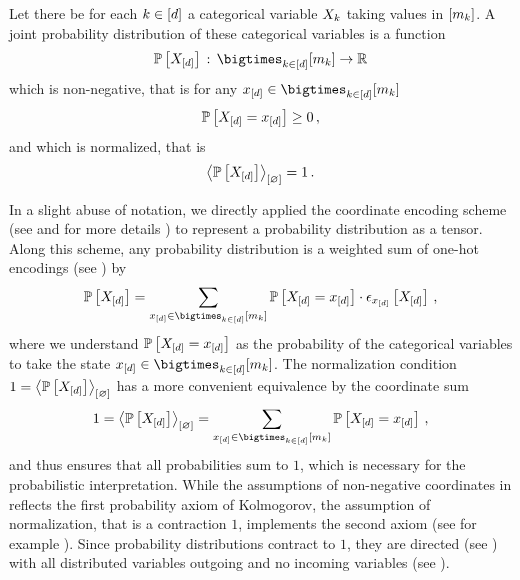 \begin{definition}
    \label{def:probabilityDistribution} %
    Let there be for each $k\in[d]$ a categorical variable $X_{k}$ taking values in $[m_{k}]$.
    A joint probability distribution of these categorical variables is a function
    \begin{align*}
        \probwith \defcols \facstates \rightarrow \rr
    \end{align*}
    which is non-negative, that is for any $\shortcatindicesin$
    \begin{align*}
        \mathbb{P}\left[X_{[d]}=x_{[d]}\right] \geq 0 \, ,
    \end{align*}
    and which is normalized, that is
    \begin{align*}
        \left\langle \mathbb{P}\left[X_{[d]}\right]\right\rangle_{\left[ \varnothing \right]} = 1 \, .
    \end{align*}
\end{definition}

In a slight abuse of notation, we directly applied the coordinate encoding scheme (see  and for more details ) to represent a probability distribution as a tensor.
Along this scheme, any probability distribution is a weighted sum of one-hot encodings (see ) by
\begin{align*} %
    \probwith = \sum_{\shortcatindices\in\facstates} \probat{\indexedshortcatvariables} \cdot \onehotmapofat{\shortcatindices}{\shortcatvariables} \, ,
\end{align*}
where we understand $\mathbb{P}\left[X_{[d]}=x_{[d]}\right]$ as the probability of the categorical variables to take the state $\shortcatindicesin$.
The normalization condition $1=\left\langle \mathbb{P}\left[X_{[d]}\right]\right\rangle_{\left[ \varnothing \right]}$ has a more convenient equivalence by the coordinate sum
\begin{align*}
    1 = \contraction{\probwith}
    =  \sum_{\shortcatindices\in\facstates}\probat{\indexedshortcatvariables} \, ,
\end{align*}
and thus ensures that all probabilities sum to $1$, which is necessary for the probabilistic interpretation.
While the assumptions of non-negative coordinates in  reflects the first probability axiom of Kolmogorov, the assumption of normalization, that is a contraction $1$, implements the second axiom (see for example \cite{degroot_probability_2016}).
Since probability distributions contract to $1$, they are directed (see ) with all distributed variables outgoing and no incoming variables (see ).

